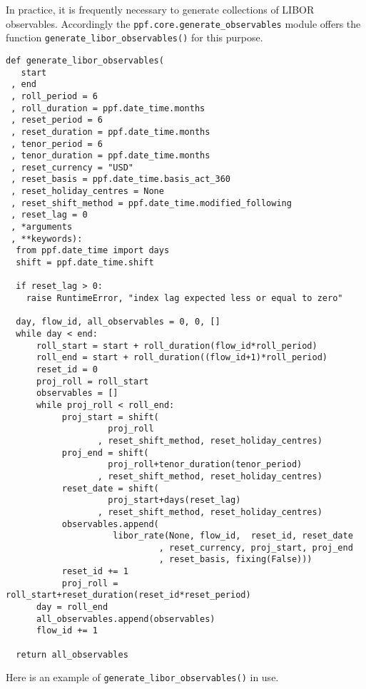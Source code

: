 In practice, it is frequently necessary to generate collections of
LIBOR observables. Accordingly the
\verb|ppf.core.generate_observables| module offers the function
\verb|generate_libor_observables()| for this purpose.
\begin{verbatim}
def generate_libor_observables(
   start
 , end
 , roll_period = 6
 , roll_duration = ppf.date_time.months
 , reset_period = 6
 , reset_duration = ppf.date_time.months
 , tenor_period = 6
 , tenor_duration = ppf.date_time.months
 , reset_currency = "USD"
 , reset_basis = ppf.date_time.basis_act_360
 , reset_holiday_centres = None
 , reset_shift_method = ppf.date_time.modified_following
 , reset_lag = 0
 , *arguments
 , **keywords):
  from ppf.date_time import days
  shift = ppf.date_time.shift

  if reset_lag > 0:
    raise RuntimeError, "index lag expected less or equal to zero"

  day, flow_id, all_observables = 0, 0, []
  while day < end:
      roll_start = start + roll_duration(flow_id*roll_period)
      roll_end = start + roll_duration((flow_id+1)*roll_period)
      reset_id = 0
      proj_roll = roll_start
      observables = []
      while proj_roll < roll_end:
           proj_start = shift(
                    proj_roll
                  , reset_shift_method, reset_holiday_centres)
           proj_end = shift(
                    proj_roll+tenor_duration(tenor_period)
                  , reset_shift_method, reset_holiday_centres)
           reset_date = shift(
                    proj_start+days(reset_lag)
                  , reset_shift_method, reset_holiday_centres)
           observables.append( 
                     libor_rate(None, flow_id,  reset_id, reset_date
                              , reset_currency, proj_start, proj_end
                              , reset_basis, fixing(False)))
           reset_id += 1
           proj_roll = roll_start+reset_duration(reset_id*reset_period) 
      day = roll_end
      all_observables.append(observables)
      flow_id += 1

  return all_observables
\end{verbatim}
Here is an example of \verb|generate_libor_observables()| in use.
